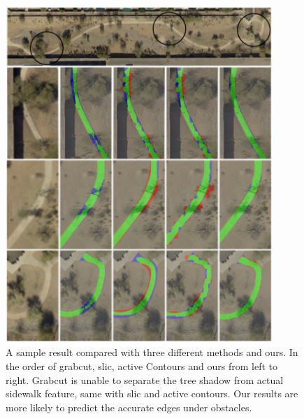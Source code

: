 \begin{figure}[H]
    \centering
    \includegraphics[width=0.9\textwidth]{Figures/4_comparison.pdf}
    \caption[Methods Comparison on Sample Sidewalk 1]{A sample result compared with three different methods and ours. In the order of grabcut, slic, active Contours and ours from left to right. Grabcut is unable to separate the tree shadow from actual sidewalk feature, same with slic and active contours. Our results are more likely to predict the accurate edges under obstacles.}
    \label{fig:Sample_4_compare}
\end{figure}


